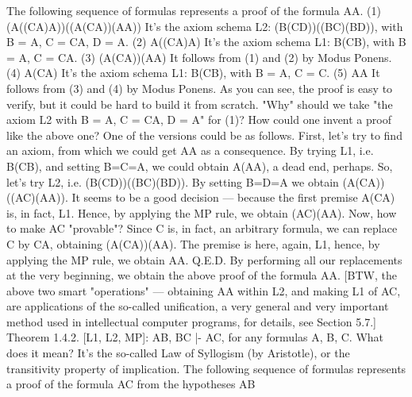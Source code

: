 The following sequence of formulas represents a proof of the formula A\IMPLIES A.
(1) (A\IMPLIES ((C\IMPLIES A)\IMPLIES A))\IMPLIES ((A\IMPLIES (C\IMPLIES A))\IMPLIES (A\IMPLIES A)) It's the axiom schema L2:
                                                   (B\IMPLIES (C\IMPLIES D))\IMPLIES ((B\IMPLIES C)\IMPLIES (B\IMPLIES D)),
                                                              with B = A, C = C\IMPLIES A, D = A.
(2) A\IMPLIES ((C\IMPLIES A)\IMPLIES A) It's the axiom schema L1:
                     B\IMPLIES (C\IMPLIES B), with B = A, C = C\IMPLIES A.
(3) (A\IMPLIES (C\IMPLIES A))\IMPLIES (A\IMPLIES A) It follows from (1) and (2) by Modus
                           Ponens.
(4) A\IMPLIES (C\IMPLIES A) It's the axiom schema L1:
               B\IMPLIES (C\IMPLIES B), with B = A, C = C.
(5) A\IMPLIES A It follows from (3) and (4) by Modus
         Ponens.
As you can see, the proof is easy to verify, but it could be hard to build it from scratch. "Why" should we
take "the axiom L2 with B = A, C = C\IMPLIES A, D = A" for (1)?
How could one invent a proof like the above one? One of the versions could be as follows. First, let's try to find an axiom,
from which we could get A\IMPLIES A as a consequence. By trying L1, i.e. B\IMPLIES (C\IMPLIES B), and setting B=C=A, we could obtain
A\IMPLIES (A\IMPLIES A), a dead end, perhaps. So, let's try L2, i.e. (B\IMPLIES (C\IMPLIES D))\IMPLIES ((B\IMPLIES C)\IMPLIES (B\IMPLIES D)). By setting B=D=A we obtain
(A\IMPLIES (C\IMPLIES A))\IMPLIES ((A\IMPLIES C)\IMPLIES (A\IMPLIES A)). It seems to be a good decision --- because the first premise A\IMPLIES (C\IMPLIES A) is, in fact, L1.
Hence, by applying the MP rule, we obtain (A\IMPLIES C)\IMPLIES (A\IMPLIES A). Now, how to make A\IMPLIES C "provable"? Since C is, in fact, an
arbitrary formula, we can replace C by C\IMPLIES A, obtaining (A\IMPLIES (C\IMPLIES A))\IMPLIES (A\IMPLIES A). The premise is here, again, L1, hence, by
applying the MP rule, we obtain A\IMPLIES A. Q.E.D. By performing all our replacements at the very beginning, we obtain the above
proof of the formula A\IMPLIES A. [BTW, the above two smart "operations" --- obtaining A\IMPLIES A within L2, and making L1 of A\IMPLIES C,
are applications of the so-called unification, a very general and very important method used in intellectual computer programs,
for details, see Section 5.7.]
Theorem 1.4.2. [L1, L2, MP]: A\IMPLIES B, B\IMPLIES C |- A\IMPLIES C, for any formulas A, B, C. What does it mean? It's
the so-called Law of Syllogism (by Aristotle), or the transitivity property of implication.
The following sequence of formulas represents a proof of the formula A\IMPLIES C from the hypotheses A\IMPLIES B
